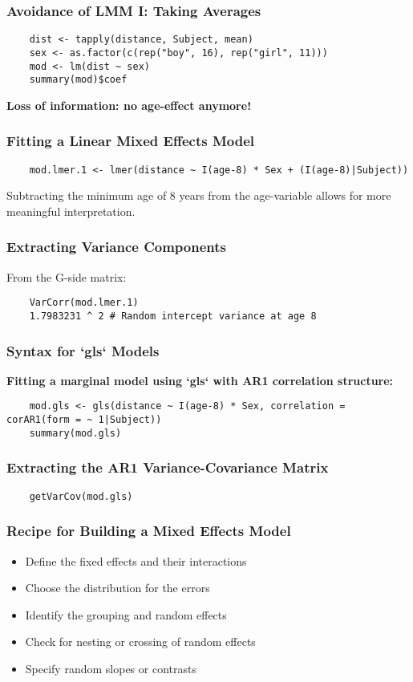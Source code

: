 \documentclass{beamer}
\begin{document}
\begin{frame}[fragile]
    \frametitle{Avoidance of LMM I: Taking Averages}
    \lstset{style=Rstyle}
    \begin{lstlisting}
    dist <- tapply(distance, Subject, mean)
    sex <- as.factor(c(rep("boy", 16), rep("girl", 11)))
    mod <- lm(dist ~ sex)
    summary(mod)$coef
    \end{lstlisting}
    \textbf{Loss of information: no age-effect anymore!}
\end{frame}

\begin{frame}[fragile]
    \frametitle{Fitting a Linear Mixed Effects Model}
    \lstset{style=Rstyle}
    \begin{lstlisting}
    mod.lmer.1 <- lmer(distance ~ I(age-8) * Sex + (I(age-8)|Subject))
    \end{lstlisting}
    Subtracting the minimum age of 8 years from the age-variable allows for more meaningful interpretation.
\end{frame}

\begin{frame}[fragile]
    \frametitle{Extracting Variance Components}
    From the G-side matrix:
    \lstset{style=Rstyle}
    \begin{lstlisting}
    VarCorr(mod.lmer.1)
    1.7983231 ^ 2 # Random intercept variance at age 8
    \end{lstlisting}
\end{frame}

\begin{frame}[fragile]
    \frametitle{Syntax for `gls` Models}
    \textbf{Fitting a marginal model using `gls` with AR1 correlation structure:}
    \lstset{style=Rstyle}
    \begin{lstlisting}
    mod.gls <- gls(distance ~ I(age-8) * Sex, correlation = corAR1(form = ~ 1|Subject))
    summary(mod.gls)
    \end{lstlisting}
\end{frame}

\begin{frame}[fragile]
    \frametitle{Extracting the AR1 Variance-Covariance Matrix}
    \lstset{style=Rstyle}
    \begin{lstlisting}
    getVarCov(mod.gls)
    \end{lstlisting}
\end{frame}

\begin{frame}
    \frametitle{Recipe for Building a Mixed Effects Model}
    \begin{itemize}
        \item Define the fixed effects and their interactions
        \item Choose the distribution for the errors
        \item Identify the grouping and random effects
        \item Check for nesting or crossing of random effects
        \item Specify random slopes or contrasts
    \end{itemize}
\end{frame}
\end{document}
